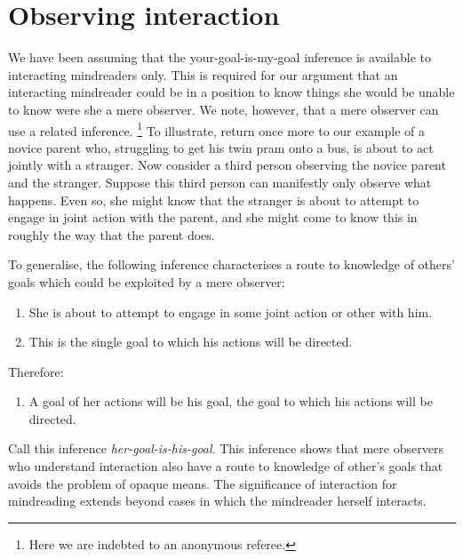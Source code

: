 \documentclass[12pt,\papersize]{extarticle}
\begin{document}
\section{Observing interaction}
\label{sec:observing_joint_action}
We have been assuming that the your-goal-is-my-goal inference is  available to interacting mindreaders only. 
This is required for our argument that 
an interacting mindreader could be in a position to know things  she would be unable to know were she a mere observer.
We note, however, that a mere observer can use a related inference.%
\footnote{
Here we are  indebted to an anonymous referee.
} 
To illustrate, return once more to our example of a novice parent who, struggling to get his twin pram onto a bus, is about to act jointly with a stranger.
Now consider a third person observing the novice parent and the stranger. 
Suppose this third person can manifestly only observe what  happens. 
Even so, she might know that the stranger is about to attempt to engage in joint action with the parent, and she might come to know this in roughly the way that the parent does. 

To generalise, the following inference characterises a route to knowledge of others' goals which could be exploited by a mere observer:
\begin{enumerate}
\item She is about to attempt to engage in some joint action or other with him.

\item This is the single goal to which his actions will be directed.

\end{enumerate}
%
Therefore:
%
\begin{enumerate}[resume]
%
\item A goal of her actions will be his goal, the goal to which his actions will be directed.
\end{enumerate}
%
Call this inference \emph{her-goal-is-his-goal}.  
This inference shows that mere observers who understand interaction also have a route to knowledge of other's goals that avoids the problem of opaque means. 
The significance of interaction for mindreading extends beyond cases in which the mindreader herself interacts.
\end{document}
